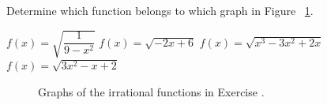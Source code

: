 \begin{Exercise}[difficulty=1, label=oef_irrat_functies] Determine which function belongs to which graph in Figure ~\ref{fig_algebraic_37}.
 		\begin{multicols}{2}
 			\Question $f(x)=\sqrt{\dfrac{1}{9-x^2}}$
 			\Question $f(x)=\sqrt{-2x+6}$
 			\Question $f(x)=\sqrt{x^3-3x^2+2x}$
 			\Question $f(x)=\sqrt{3x^2-x+2}$
 			\EndCurrentQuestion
 		\end{multicols}
 	
 		\begin{figure}[H]
 		\centerline{
\hspace{0.1cm}
}
 		\centerline{
\hspace{0.1cm}
}

 			\caption{Graphs of the irrational functions in Exercise \fi \ifcalculus15\fi.}
 			\label{fig_algebraic_37}

 	\end{figure}

\end{Exercise}

